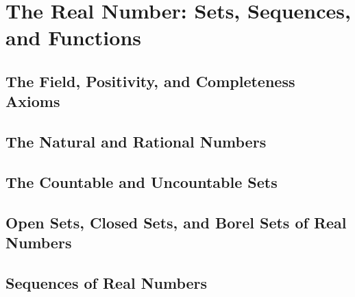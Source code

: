 \section{The Real Number: Sets, Sequences, and Functions}

\subsection{The Field, Positivity, and Completeness Axioms}


\subsection{The Natural and Rational Numbers}


\subsection{The Countable and Uncountable Sets}


\subsection{Open Sets, Closed Sets, and Borel Sets of Real Numbers}


\subsection{Sequences of Real Numbers}
